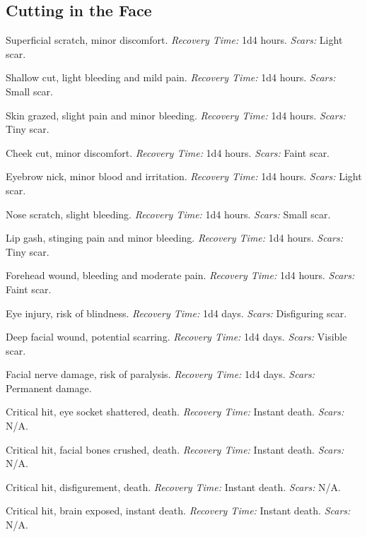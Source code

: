 \documentclass[12pt]{book}  %
\begin{document}
\subsection{Cutting in the Face}

\begin{description}[labelwidth=1.5em, leftmargin=*, itemsep=0.4em]
    \item[1 -] Superficial scratch, minor discomfort. \textit{Recovery Time:} 1d4 hours. \textit{Scars:} Light scar.
    \item[2 -] Shallow cut, light bleeding and mild pain. \textit{Recovery Time:} 1d4 hours. \textit{Scars:} Small scar.
    \item[3 -] Skin grazed, slight pain and minor bleeding. \textit{Recovery Time:} 1d4 hours. \textit{Scars:} Tiny scar.
    \item[4 -] Cheek cut, minor discomfort. \textit{Recovery Time:} 1d4 hours. \textit{Scars:} Faint scar.
    \item[5 -] Eyebrow nick, minor blood and irritation. \textit{Recovery Time:} 1d4 hours. \textit{Scars:} Light scar.
    \item[6 -] Nose scratch, slight bleeding. \textit{Recovery Time:} 1d4 hours. \textit{Scars:} Small scar.
    \item[7 -] Lip gash, stinging pain and minor bleeding. \textit{Recovery Time:} 1d4 hours. \textit{Scars:} Tiny scar.
    \item[8 -] Forehead wound, bleeding and moderate pain. \textit{Recovery Time:} 1d4 hours. \textit{Scars:} Faint scar.
    \item[9 -] Eye injury, risk of blindness. \textit{Recovery Time:} 1d4 days. \textit{Scars:} Disfiguring scar.
    \item[10 -] Deep facial wound, potential scarring. \textit{Recovery Time:} 1d4 days. \textit{Scars:} Visible scar.
    \item[11 -] Facial nerve damage, risk of paralysis. \textit{Recovery Time:} 1d4 days. \textit{Scars:} Permanent damage.
    \item[12 -] Critical hit, eye socket shattered, death. \textit{Recovery Time:} Instant death. \textit{Scars:} N/A.
    \item[13 -] Critical hit, facial bones crushed, death. \textit{Recovery Time:} Instant death. \textit{Scars:} N/A.
    \item[14 -] Critical hit, disfigurement, death. \textit{Recovery Time:} Instant death. \textit{Scars:} N/A.
    \item[15 -] Critical hit, brain exposed, instant death. \textit{Recovery Time:} Instant death. \textit{Scars:} N/A.

\end{description}
\end{document}
